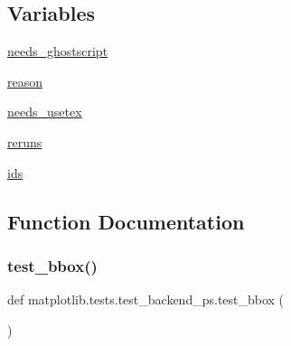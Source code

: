 \subsection*{Variables}
\begin{DoxyCompactItemize}
\item 
\hyperlink{namespacematplotlib_1_1tests_1_1test__backend__ps_a4907bd45aa856a9054132e6855a007ff}{needs\+\_\+ghostscript}
\item 
\hyperlink{namespacematplotlib_1_1tests_1_1test__backend__ps_a066df8f1617ee64d818f896f4fe977db}{reason}
\item 
\hyperlink{namespacematplotlib_1_1tests_1_1test__backend__ps_aea36a0ca706cd76b6138958f23114726}{needs\+\_\+usetex}
\item 
\hyperlink{namespacematplotlib_1_1tests_1_1test__backend__ps_a0424b01bafc526cc0a8a6a72ec6ff8f6}{reruns}
\item 
\hyperlink{namespacematplotlib_1_1tests_1_1test__backend__ps_ae4b47c598a5fb58ff73b317d5c8e3b72}{ids}
\end{DoxyCompactItemize}


\subsection{Function Documentation}
\mbox{\label{namespacematplotlib_1_1tests_1_1test__backend__ps_a40e5488fb4432dc211f03eb4fc56e346}} 
\subsubsection{\texorpdfstring{test\+\_\+bbox()}{test\_bbox()}}
{\footnotesize\ttfamily def matplotlib.\+tests.\+test\+\_\+backend\+\_\+ps.\+test\+\_\+bbox (\begin{DoxyParamCaption}{ }\end{DoxyParamCaption})}

\mbox{\label{namespacematplotlib_1_1tests_1_1test__backend__ps_ab113bbe70b35f6508728bf6b9fbf4f61}} 
